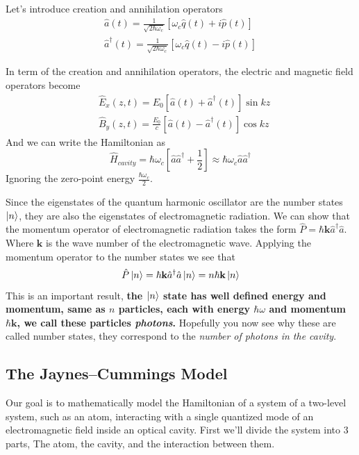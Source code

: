 Let’s introduce creation and annihilation operators
\begin{align*}
    \hat{a} (t) = \frac{1}{\sqrt{2\hbar\omega_c}}[\omega_c\hat{q} (t) + i\hat{p} (t)] \\
    \hat{a}^\dag (t) = \frac{1}{\sqrt{2\hbar\omega_c}}[\omega_c\hat{q} (t) - i\hat{p} (t)]
\end{align*}

In term of the creation and annihilation operators, the electric and magnetic field operators become
\begin{align}
         &\hat{E}_x (   z, t) = E_0[\hat{a} (t) + \hat{a}^\dag (t)]\sin{kz} \\
         &\hat{B}_y (z, t) = \frac{E_0}{c}[\hat{a} (t) - \hat{a}^\dag (t)]\cos{kz}
\end{align}
And we can write the Hamiltonian as
\begin{equation}\label{eq:cavity_hamiltonian}
    \hat{H}_{cavity} = \hbar\omega_c[\hat{a}\hat{a}^\dag + \frac{1}{2}] \approx \hbar\omega_c\hat{a}\hat{a}^\dag
\end{equation}
Ignoring the zero-point energy $\frac{\hbar\omega_c}{2}$.

Since the eigenstates of the quantum harmonic oscillator are the number states $\ket{n}$, they are also the eigenstates of electromagnetic radiation. We can show that the momentum operator of electromagnetic radiation takes the form $\hat{P} = \hbar \textbf{k} \hat{a}^\dag \hat{a}$. Where $\textbf{k}$ is the wave number of the electromagnetic wave. Applying the momentum operator to the number states we  see that
\[
    \hat{P}\ket{n} =  \hbar \textbf{k} \hat{a}^\dag \hat{a} \ket{n} = n\hbar \textbf{k}\ket{n}
\]
This is an important result, \textbf{the $\ket{n}$ state has well defined energy and momentum, same as $n$ particles, each with energy $\hbar \omega$ and momentum $\hbar \textbf{k}$, we call these particles \textit{photons}.} Hopefully you now see why these are called number states, they correspond to the \textit{number of photons in the cavity}.

\subsection{The Jaynes–Cummings Model}
Our goal is to mathematically model the Hamiltonian of a system of a two-level system, such as an atom, interacting with a single quantized mode of an electromagnetic field inside an optical cavity. First we'll divide the system into 3 parts, The atom, the cavity, and the interaction between them.

